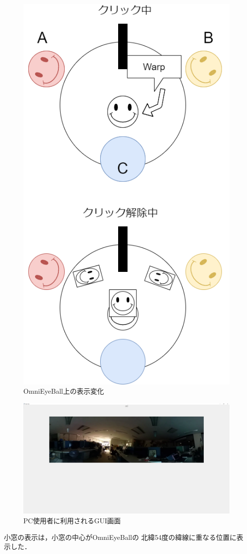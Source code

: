 \begin{figure}[tbp]
  \centering
  \includegraphics[scale=0.7]{fig/GUI3.png}
  \caption{OmniEyeBall上の表示変化}
\end{figure}

\begin{figure}[tbp]
  \centering
  \includegraphics[scale=0.1]{fig/GUI.png}
  \caption{PC使用者に利用されるGUI画面}
\end{figure}

小窓の表示は，小窓の中心がOmniEyeBallの
北緯54度の緯線に重なる位置に表示した．

